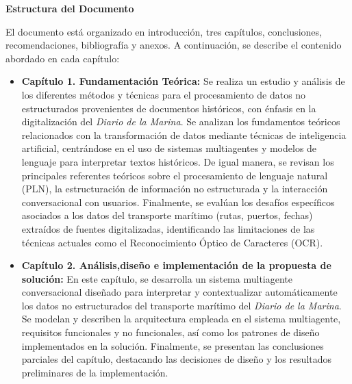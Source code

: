 \textbf{Estructura del Documento}

El documento está organizado en introducción, tres capítulos, conclusiones, recomendaciones, bibliografía y anexos. A continuación, se describe el contenido abordado en cada capítulo:

\begin{itemize}
	\item \textbf{Capítulo 1. Fundamentación Teórica:} Se realiza un estudio y análisis de los diferentes métodos y técnicas para el procesamiento de datos no estructurados provenientes de documentos históricos, con énfasis en la digitalización del \textit{Diario de la Marina}. Se analizan los fundamentos teóricos relacionados con la transformación de datos mediante técnicas de inteligencia artificial, centrándose en el uso de sistemas multiagentes y modelos de lenguaje para interpretar textos históricos. De igual manera, se revisan los principales referentes teóricos sobre el procesamiento de lenguaje natural (PLN), la estructuración de información no estructurada y la interacción conversacional con usuarios. Finalmente, se evalúan los desafíos específicos asociados a los datos del transporte marítimo (rutas, puertos, fechas) extraídos de fuentes digitalizadas, identificando las limitaciones de las técnicas actuales como el Reconocimiento Óptico de Caracteres (OCR).
	
	\item \textbf{Capítulo 2. Análisis,diseño e implementación de la propuesta de solución:} En este capítulo, se desarrolla un sistema multiagente conversacional diseñado para interpretar y contextualizar automáticamente los datos no estructurados del transporte marítimo del \textit{Diario de la Marina}. Se modelan y describen la arquitectura empleada en el sistema multiagente, requisitos funcionales y no funcionales, así como los patrones de diseño implementados en la solución. Finalmente, se presentan las conclusiones parciales del capítulo, destacando las decisiones de diseño y los resultados preliminares de la implementación.
	

\end{itemize}
